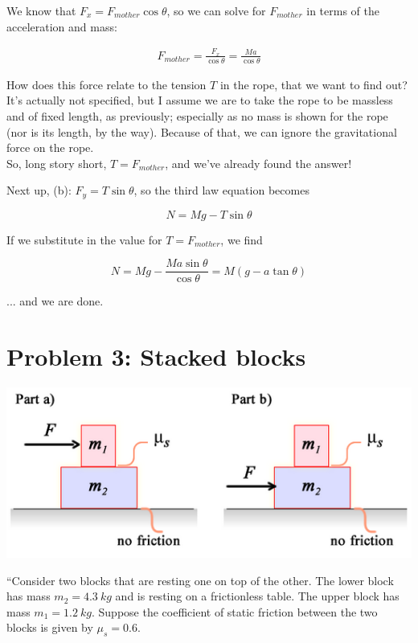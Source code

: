 \documentclass[8.01x]{subfiles}
\begin{document}
We know that $F_x = F_{mother} \cos \theta$, so we can solve for $F_{mother}$ in terms of the acceleration and mass:

\begin{align}
F_{mother} = \frac{F_x}{\cos \theta} = \frac{M a}{\cos \theta}
\end{align}

How does this force relate to the tension $T$ in the rope, that we want to find out? It's actually not specified, but I assume we are to take the rope to be massless and of fixed length, as previously; especially as no mass is shown for the rope (nor is its length, by the way). Because of that, we can ignore the gravitational force on the rope.\\
So, long story short, $T = F_{mother}$, and we've already found the answer!

Next up, (b): $F_y = T \sin \theta$, so the third law equation becomes

\begin{equation}
N = M g - T \sin \theta
\end{equation}

If we substitute in the value for $T = F_{mother}$, we find

\begin{equation}
N = M g - \frac{M a \sin \theta}{\cos \theta} = M(g - a \tan \theta)
\end{equation}

... and we are done.

\section{Problem 3: Stacked blocks}

\begin{center}
\includegraphics[scale=0.65]{Graphics/h3p3}
\end{center}

``Consider two blocks that are resting one on top of the other. The lower block has mass $m_2 = \SI{4.3}{kg}$ and is resting on a frictionless table. The upper block has mass $m_1 = \SI{1.2}{kg}$. Suppose the coefficient of static friction between the two blocks is given by $\mu_s = 0.6$.
\end{document}
